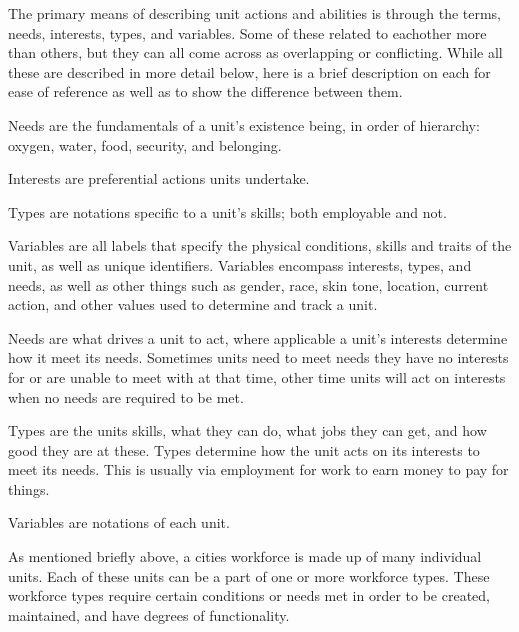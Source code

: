 


The primary means of describing unit actions and abilities is through the terms, needs, interests, types, and variables. Some of these related to eachother more than others, but they can all come across as overlapping or conflicting. While all these are described in more detail below, here is a brief description on each for ease of reference as well as to show the difference between them.

Needs are the fundamentals of a unit's existence being, in order of hierarchy: oxygen, water, food, security, and belonging.

Interests are preferential actions units undertake.

Types are notations specific to a unit's skills; both employable and not. 

Variables are all labels that specify the physical conditions, skills and traits of the unit, as well as unique identifiers. Variables encompass interests, types, and needs, as well as other things such as gender, race, skin tone, location, current action, and other values used to determine and track a unit.

Needs are what drives a unit to act, where applicable a unit's interests determine how it meet its needs. Sometimes units need to meet needs they have no interests for or are unable to meet with at that time, other time units will act on interests when no needs are required to be met.

Types are the units skills, what they can do, what jobs they can get, and how good they are at these. Types determine how the unit acts on its interests to meet its needs. This is usually via employment for work to earn money to pay for things.

Variables are notations of each unit.



As mentioned briefly above, a cities workforce is made up of many individual units. Each of these units can be a part of one or more workforce types. These workforce types require certain conditions or needs met in order to be created, maintained, and have degrees of functionality. 


